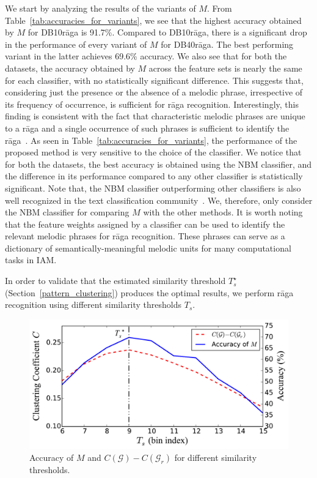 We start by analyzing the results of the variants of $M$. From Table~\ref{tab:accuracies_for_variants}, we see that the highest accuracy obtained by $M$ for DB10r\={a}ga is 91.7\%. Compared to DB10r\={a}ga, there is a significant drop in the performance of every variant of $M$ for DB40r\={a}ga. The best performing variant in the latter achieves 69.6\% accuracy. We also see that for both the datasets, the accuracy obtained by $M$ across the feature sets is nearly the same for each classifier, with no statistically significant difference. This suggests that, considering just the presence or the absence of a melodic phrase, irrespective of its frequency of occurrence, is sufficient for r\={a}ga recognition. Interestingly, this finding is consistent with the fact that characteristic melodic phrases are unique to a r\={a}ga and a single occurrence of such phrases is sufficient to identify the r\={a}ga~\cite{krishna2012carnatic}. As seen in Table~\ref{tab:accuracies_for_variants}, the performance of the proposed method is very sensitive to the choice of the classifier. We notice that for both the datasets, the best accuracy is obtained using the NBM classifier, and the difference in its performance compared to any other classifier is statistically significant. Note that, the NBM classifier outperforming other classifiers is also well recognized in the text classification community~\cite{mccallum1998comparison}. We, therefore, only consider the NBM classifier for comparing $M$ with the other methods. It is worth noting that the feature weights assigned by a classifier can be used to identify the relevant melodic phrases for r\={a}ga recognition. These phrases can serve as a dictionary of semantically-meaningful melodic units for many computational tasks in IAM.

In order to validate that the estimated similarity threshold $T_{s}^\star$ (Section~\ref{pattern_clustering}) produces the optimal results, we perform r\={a}ga recognition using different similarity thresholds $T_{s}$. 

\begin{figure}
	\begin{center}
		\includegraphics[width=\figSizeEighty]{ch07_ragaRecognition/figures/accuracy_Vs_thresold.pdf}
	\end{center}
	\caption{Accuracy of $M$ and $C(\mathcal{G})-C(\mathcal{G}_r)$ for different similarity thresholds.}
	\label{fig:performance_across_thresholds}
\end{figure}


